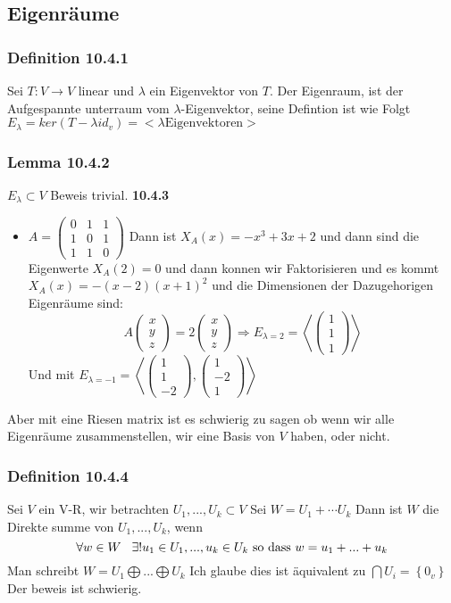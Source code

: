 \documentclass{article}
\newcommand{\smspc}{\hspace{0.3cm}}
\newcommand{\lemma}[1]{\subsubsection*{Lemma {#1}}}
\newcommand{\definition}[1]{\subsubsection*{Definition {#1}}}
\begin{document}
\subsection*{Eigenräume}\definition{10.4.1} Sei $T:V\rightarrow V$ linear und $\lambda$ ein Eigenvektor von $T$. Der Eigenraum, ist der Aufgespannte unterraum vom $\lambda$-Eigenvektor, seine Defintion ist wie Folgt $E_\lambda=ker(T-\lambda id_v)=<\lambda\text{Eigenvektoren}>$
\lemma{10.4.2} $E_\lambda\subset V$ Beweis trivial.
\textbf{10.4.3}\begin{itemize}
  \item{$A=\begin{pmatrix}0&1&1\\1&0&1\\1&1&0\end{pmatrix}$ Dann ist $X_A(x)=-x^3+3x+2$ und dann sind die Eigenwerte $X_A(2)=0$ und dann konnen wir Faktorisieren und es kommt $X_A(x)=-(x-2)(x+1)^2$ und die Dimensionen der Dazugehorigen Eigenräume sind:\[A\begin{pmatrix}x\\y\\z\end{pmatrix}=2\begin{pmatrix}x\\y\\z\end{pmatrix}\Rightarrow E_{\lambda=2}=\left<\begin{pmatrix}1\\1\\1\end{pmatrix}\right>\]
    Und mit $E_{\lambda=-1}=\left<\begin{pmatrix}1\\1\\-2\end{pmatrix},\begin{pmatrix}1\\-2\\1\end{pmatrix}\right>$}
\end{itemize}
Aber mit eine Riesen matrix ist es schwierig zu sagen ob wenn wir alle Eigenräume zusammenstellen, wir eine Basis von $V$ haben, oder nicht. 
\definition{10.4.4} Sei $V$ ein V-R, wir betrachten $U_1, ..., U_k\subset V$ Sei $W=U_1+\cdots U_k$ Dann ist $W$ die Direkte summe von $U_1,...,U_k$, wenn \[\forall w \in W\smspc \exists!u_1\in U_1,..., u_k\in U_k\text{ so dass } w=u_1+...+u_k\] Man schreibt $W=U_1\bigoplus...\bigoplus U_k$
 Ich glaube dies ist äquivalent zu $\bigcap U_i=\left\lbrace0_v\right\rbrace$ Der beweis ist schwierig.
\end{document}
